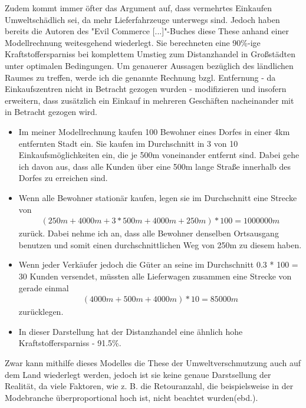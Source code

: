 \begin{folding} %

Zudem kommt immer öfter das Argument auf, dass vermehrtes Einkaufen Umweltschädlich sei, da mehr Lieferfahrzeuge unterwegs sind. Jedoch haben bereits die Autoren des "Evil Commerce [...]"-Buches diese These anhand einer Modellrechnung weitesgehend wiederlegt. Sie berechneten eine 90\%-ige Kraftstoffersparniss bei komplettem Umstieg zum Distanzhandel in Großstädten unter optimalen Bedingungen\cite[S. 25f]{evilcom}. Um genauerer Aussagen bezüglich des ländlichen Raumes zu treffen, werde ich die genannte Rechnung bzgl. Entfernung - da Einkaufszentren nicht in Betracht gezogen wurden - modifizieren und insofern erweitern, dass zusätzlich ein Einkauf in mehreren Geschäften nacheinander mit in Betracht gezogen wird.

\begin{itemize}
\item Im meiner Modellrechnung kaufen 100 Bewohner eines Dorfes in einer 4km entfernten Stadt ein. Sie kaufen im Durchschnitt in 3 von 10 Einkaufsmöglichkeiten ein, die je 500m voneinander entfernt sind. Dabei gehe ich davon aus, dass alle Kunden über eine 500m lange Straße innerhalb des Dorfes zu erreichen sind.

\item Wenn alle Bewohner stationär kaufen, legen sie im Durchschnitt eine Strecke von 
\begin{align}
    (250m + 4000m + 3 * 500m + 4000m + 250m) * 100 = 1000000m
\end{align}
 zurück. Dabei nehme ich an, dass alle Bewohner denselben Ortsausgang benutzen und somit einen durchschnittlichen Weg von 250m zu diesem haben.

\item Wenn jeder Verkäufer jedoch die Güter an seine im Durchschnitt 0.3 * 100 = 30 Kunden versendet, müssten alle Lieferwagen zusammen eine Strecke von gerade einmal 
\begin{align}
    (4000m + 500m + 4000m) * 10 = 85000m
\end{align}
zurücklegen.

\item In dieser Darstellung hat der Distanzhandel eine ähnlich hohe Kraftstoffersparniss - 91.5\%. 
\end{itemize}
Zwar kann mithilfe dieses Modelles die These der Umweltverschmutzung auch auf dem Land wiederlegt werden, jedoch ist sie keine genaue Darstsellung der Realität, da viele Faktoren, wie z. B. die Retouranzahl, die beispielsweise in der Modebranche überproportional hoch ist, nicht beachtet wurden(ebd.).

\end{folding}
